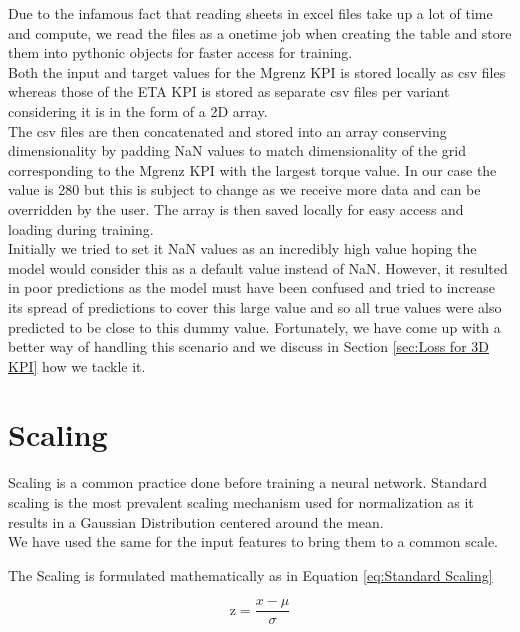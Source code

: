 \documentclass{report} %
\begin{document}
Due to the infamous fact that reading sheets in excel files take up a lot of time and compute, we read the files as a onetime job when creating the table and store them into pythonic objects for faster access for training.\\
Both the input and target values for the Mgrenz \ac{KPI} is stored locally as csv files whereas those of the ETA \ac{KPI} is stored as separate csv files per variant considering it is in the form of a \ac{2D} array.\\
The csv files are then concatenated and stored into an array conserving dimensionality by padding \ac{NaN} values to match dimensionality of the grid corresponding to the Mgrenz \ac{KPI} with the largest torque value.
In our case the value is 280 but this is subject to change as we receive more data and can be overridden by the user.
The array is then saved locally for easy access and loading during training.\\

Initially  we tried to set it \ac{NaN} values as an incredibly high value hoping the model would consider this as a default value instead of \ac{NaN}.
However, it resulted in poor predictions as the model must have been confused and tried to increase its spread of predictions to cover this large value and so all true values were also predicted to be close to this dummy value.
Fortunately, we have come up with a better way of handling this scenario and we discuss in Section \ref{sec:Loss for 3D KPI} how we tackle it.


\section{Scaling}\label{sec:Scaling}

Scaling is a common practice done before training a neural network. 
Standard scaling is the most prevalent scaling mechanism used for normalization as it results in a Gaussian Distribution centered around the mean. \\
We have used the same for the input features to bring them to a common scale. 

The Scaling is formulated mathematically as in Equation \ref{eq:Standard Scaling}

\begin{equation}
    \text{z} = \frac{x - \mu}{\sigma}
    \label{eq:Standard Scaling}
\end{equation} 

\end{document}
